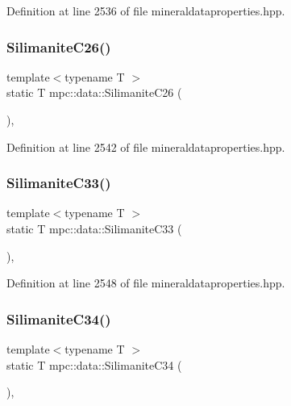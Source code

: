 Definition at line 2536 of file mineraldataproperties.\+hpp.

\mbox{\label{namespacempc_1_1data_a26a2a33a4f00fc1d351a6591eeee04ef}} 
\subsubsection{\texorpdfstring{Silimanite\+C26()}{SilimaniteC26()}}
{\footnotesize\ttfamily template$<$typename T $>$ \\
static T mpc\+::data\+::\+Silimanite\+C26 (\begin{DoxyParamCaption}{ }\end{DoxyParamCaption})\hspace{0.3cm}{\ttfamily [inline]}, {\ttfamily [static]}}



Definition at line 2542 of file mineraldataproperties.\+hpp.

\mbox{\label{namespacempc_1_1data_a2467b74042cd194a6ca6297fec1939bd}} 
\subsubsection{\texorpdfstring{Silimanite\+C33()}{SilimaniteC33()}}
{\footnotesize\ttfamily template$<$typename T $>$ \\
static T mpc\+::data\+::\+Silimanite\+C33 (\begin{DoxyParamCaption}{ }\end{DoxyParamCaption})\hspace{0.3cm}{\ttfamily [inline]}, {\ttfamily [static]}}



Definition at line 2548 of file mineraldataproperties.\+hpp.

\mbox{\label{namespacempc_1_1data_a021af61b9cf14c88f1ae44435edf75a4}} 
\subsubsection{\texorpdfstring{Silimanite\+C34()}{SilimaniteC34()}}
{\footnotesize\ttfamily template$<$typename T $>$ \\
static T mpc\+::data\+::\+Silimanite\+C34 (\begin{DoxyParamCaption}{ }\end{DoxyParamCaption})\hspace{0.3cm}{\ttfamily [inline]}, {\ttfamily [static]}}



